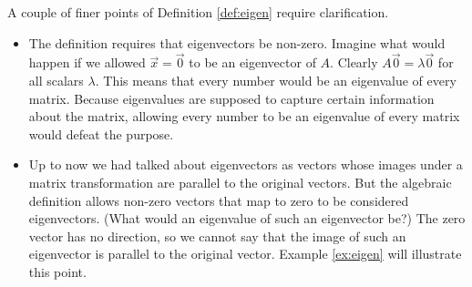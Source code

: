 \documentclass{ximera}
\begin{document}
A couple of finer points of Definition \ref{def:eigen} require clarification.
  \begin{itemize}
  \item The definition requires that eigenvectors be non-zero.  Imagine what would happen if we allowed $\vec{x}=\vec{0}$ to be an eigenvector of $A$. Clearly $A\vec{0}=\lambda\vec{0}$ for all scalars $\lambda$.  This means that every number would be an eigenvalue of every matrix.  Because eigenvalues are supposed to capture certain information about the matrix, allowing every number to be an eigenvalue of every matrix would defeat the purpose.
  \item Up to now we had talked about  eigenvectors as vectors whose images under a matrix transformation are parallel to the original vectors.  But the algebraic definition allows non-zero vectors that map to zero to be considered eigenvectors.  (What would an eigenvalue of such an eigenvector be?)  The zero vector has no direction, so we cannot say that the image of such an eigenvector is parallel to the original vector.  Example \ref{ex:eigen} will illustrate this point.
  \end{itemize}
\end{document}
